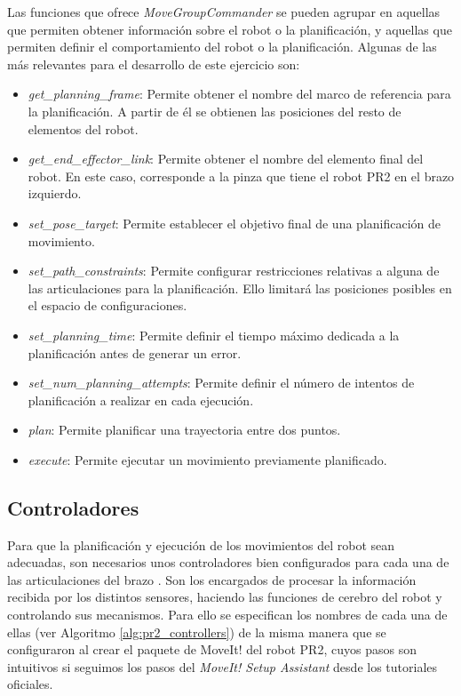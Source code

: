 \documentclass[12pt,spanish,chapterprefix, numbers=noenddot]{book}
\numberwithin{equation}{section}
\numberwithin{figure}{section}
\begin{document}
Las funciones que ofrece \textit{MoveGroupCommander} \cite{movegroup} se pueden agrupar en aquellas que permiten obtener información sobre el robot o la planificación, y aquellas que permiten definir el comportamiento del robot o la planificación. 
Algunas de las más relevantes para el desarrollo de este ejercicio son: 
\begin{itemize}
\item \textit{get\_planning\_frame}: Permite obtener el nombre del marco de referencia para la planificación. A partir de él se obtienen las posiciones del resto de elementos del robot. 
\item \textit{get\_end\_effector\_link}: Permite obtener el nombre del elemento final del robot. En este caso, corresponde a la pinza que tiene el robot PR2 en el brazo izquierdo. 
\item \textit{set\_pose\_target}: Permite establecer el objetivo final de una planificación de movimiento. 
\item \textit{set\_path\_constraints}: Permite configurar restricciones relativas a alguna de las articulaciones para la planificación. Ello limitará las posiciones posibles en el espacio de configuraciones.
\item \textit{set\_planning\_time}: Permite definir el tiempo máximo dedicada a la planificación antes de generar un error. 
\item \textit{set\_num\_planning\_attempts}: Permite definir el número de intentos de planificación a realizar en cada ejecución.  
\item \textit{plan}: Permite planificar una trayectoria entre dos puntos.  
\item \textit{execute}: Permite ejecutar un movimiento previamente planificado. 
\end{itemize}

\subsection{Controladores}
Para que la planificación y ejecución de los movimientos del robot sean adecuadas, son necesarios unos controladores bien configurados para cada una de las articulaciones del brazo \cite{pr2_controllers}. Son los encargados de procesar la información recibida por los distintos sensores, haciendo las funciones de cerebro del robot y controlando sus mecanismos.
Para ello se especifican los nombres de cada una de ellas (ver Algoritmo \ref{alg:pr2_controllers}) de la misma manera que se configuraron al crear el paquete de MoveIt! del robot PR2, cuyos pasos son intuitivos si seguimos los pasos del \textit{MoveIt! Setup Assistant} desde los tutoriales oficiales. \cite{moveit_tutorials}
\end{document}
